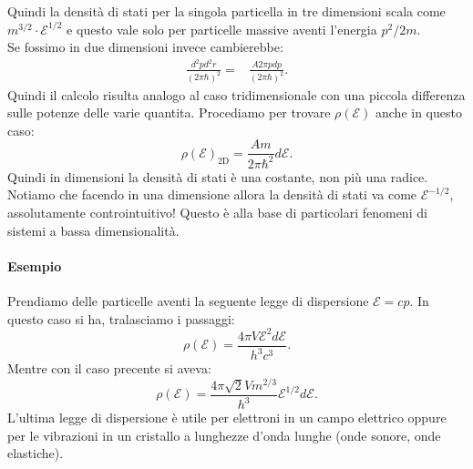 Quindi la densità di stati per la singola particella in tre dimensioni scala come $ m ^{3 /2} \cdot  \mathcal{E}^{1 /2}$ e questo vale solo per particelle massive aventi l'energia $p^2 /2m$. \\
Se fossimo in due dimensioni invece cambierebbe:
\begin{align}
	\frac{d^2p d^2r}{\left( 2\pi \hbar  \right)^2} =& \frac{A 2\pi p dp}{\left( 2\pi \hbar \right)^2 }
.\end{align}
Quindi il calcolo risulta analogo al caso tridimensionale con una piccola differenza sulle potenze delle varie quantita. Procediamo per trovare $\rho\left( \mathcal{E} \right)$ anche in questo caso:
\[
	\rho\left( \mathcal{E} \right) _{\text{2D}} = \frac{Am}{2\pi \hbar^2} d\mathcal{E}
.\] 
Quindi in dimensioni la densità di stati è una costante, non più una radice. \\
Notiamo che facendo in una dimensione allora la densità di stati va come $\mathcal{E}^{-1 /2}$, assolutamente controintuitivo! Questo è alla base di particolari fenomeni di sistemi a bassa dimensionalità.

\paragraph{Esempio}%
Prendiamo delle particelle aventi la seguente legge di dispersione $\mathcal{E} = c p$. In questo caso si ha, tralasciamo i passaggi:
\[
	\rho\left( \mathcal{E} \right) = \frac{4\pi V \mathcal{E}^2d\mathcal{E}}{h^3 c^3}
.\] 
Mentre con il caso precente si aveva:
\[
	\rho\left( \mathcal{E} \right) = \frac{4\pi \sqrt{2} V m ^{2 /3}}{h^3} \mathcal{E}^{1 /2}d\mathcal{E}
.\] 
L'ultima legge di dispersione è utile per elettroni in un campo elettrico oppure per le vibrazioni in un cristallo a lunghezze d'onda lunghe (onde sonore, onde elastiche).\\
